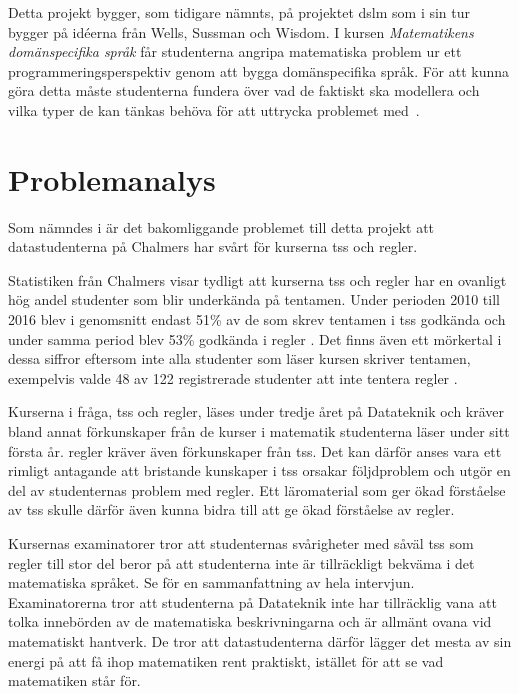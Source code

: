 \documentclass[12pt,a4paper,twoside,openright]{article}
\begin{document}
Detta projekt bygger, som tidigare nämnts, på projektet \gls{dslm} som
i sin tur bygger på idéerna från Wells, Sussman och Wisdom. I kursen
\textit{Matematikens domänspecifika språk} får studenterna
angripa matematiska problem ur ett programmeringsperspektiv
genom att bygga domänspecifika språk. För att kunna göra detta måste
studenterna fundera över vad de faktiskt ska modellera och vilka typer
de kan tänkas behöva för att uttrycka problemet
med~\cite{kursplan:dslsofmath}.

\newpage

\section{Problemanalys}
Som nämndes i  är det bakomliggande
problemet till detta projekt att datastudenterna
på Chalmers har svårt för kurserna \gls{tss} och \gls{regler}.

Statistiken från Chalmers visar tydligt att kurserna \gls{tss} och
\gls{regler} har en ovanligt hög andel studenter som blir underkända
på tentamen. Under perioden 2010 till 2016 blev i genomsnitt endast
51\% av de som skrev tentamen i \gls{tss} godkända och under samma
period blev 53\% godkända i \gls{regler} \cite{tentastatistik}.
Det finns även ett mörkertal i dessa siffror eftersom inte alla
studenter som läser kursen skriver tentamen, exempelvis valde 48 av
122 registrerade studenter att inte tentera \gls{regler}
\cite{kursinformation:ere102:14-15}.

Kurserna i fråga, \gls{tss} och \gls{regler}, läses under tredje året
på Datateknik och kräver bland annat förkunskaper från de kurser i
matematik studenterna läser under sitt första år. \gls{regler} kräver
även förkunskaper från \gls{tss}. Det kan därför anses vara ett
rimligt antagande att bristande kunskaper i \gls{tss} orsakar
följdproblem och utgör en del av studenternas problem med
\gls{regler}. Ett läromaterial som ger ökad förståelse av \gls{tss}
skulle därför även kunna bidra till att ge ökad förståelse av \gls{regler}.

Kursernas examinatorer tror att studenternas svårigheter med
såväl \gls{tss} som \gls{regler}
till stor del beror på att studenterna inte är tillräckligt bekväma i
det matematiska språket. Se  för en
sammanfattning av hela intervjun. Examinatorerna tror att studenterna
på Datateknik inte har tillräcklig vana att tolka innebörden av de
matematiska beskrivningarna och är allmänt ovana vid matematiskt
hantverk. De tror att datastudenterna därför lägger det mesta av sin
energi på att få ihop matematiken rent praktiskt, istället för att se
vad matematiken står för.
\end{document}
